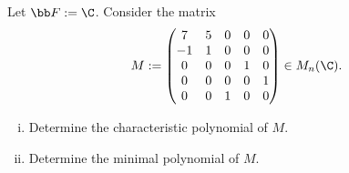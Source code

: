 \documentclass[a4paper]{article}
\begin{document}
\begin{questionbody}
Let $\bb F := \C$. Consider the matrix \[
M := \begin{pmatrix}
7 & 5 & 0 & 0 & 0 \\
-1 & 1 & 0 & 0 & 0 \\
0 & 0 & 0 & 1 & 0 \\
0 & 0 & 0 & 0 & 1 \\
0 & 0 & 1 & 0 & 0
\end{pmatrix} \in M_n(\C).
\]
\begin{enumerate}[(i)]
\item Determine the characteristic polynomial of $M$.

\item Determine the minimal polynomial of $M$.
\end{enumerate}
\end{questionbody}

\subsection{~} %
\end{document}
